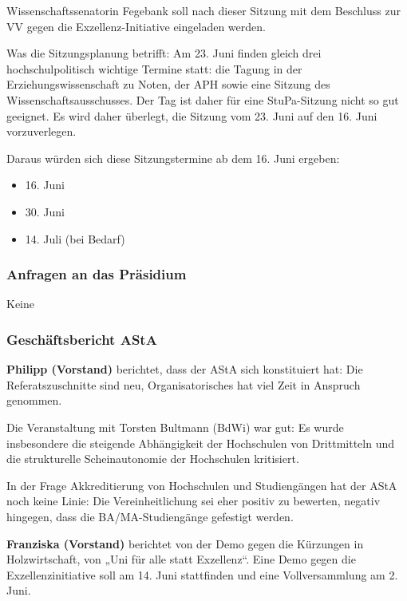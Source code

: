 \documentclass[ngerman,headheight=70pt]{scrartcl}
\begin{document}
    Wissenschaftssenatorin Fegebank soll nach dieser Sitzung mit dem Beschluss
    zur VV gegen die Exzellenz-Initiative eingeladen werden.

    Was die Sitzungsplanung betrifft: Am 23. Juni finden gleich drei
    hochschulpolitisch wichtige Termine statt: die Tagung in der
    Erziehungswissenschaft zu Noten,  der APH sowie eine Sitzung des
    Wissenschaftsausschusses. Der Tag ist daher für eine StuPa-Sitzung nicht so
    gut geeignet. Es wird daher überlegt, die Sitzung vom 23. Juni auf den 16.
    Juni vorzuverlegen.

    Daraus würden sich diese Sitzungstermine ab dem 16. Juni ergeben:
    \begin{itemize}
        \item 16. Juni
        \item 30. Juni
        \item 14. Juli (bei Bedarf)
    \end{itemize}

    \subsubsection{Anfragen an das Präsidium}

    Keine

    \subsubsection{Geschäftsbericht AStA}

    \textbf{Philipp (Vorstand)} berichtet, dass der AStA sich konstituiert hat:
    Die Referatszuschnitte sind neu, Organisatorisches hat viel Zeit in Anspruch
    genommen.

    Die Veranstaltung mit Torsten Bultmann (BdWi) war gut: Es wurde insbesondere
    die steigende Abhängigkeit der Hochschulen von Drittmitteln und die
    strukturelle Scheinautonomie der Hochschulen kritisiert.

    In der Frage Akkreditierung von Hochschulen und Studiengängen hat der AStA
    noch keine Linie: Die Vereinheitlichung sei eher positiv zu bewerten, negativ
    hingegen, dass die BA/MA-Studiengänge gefestigt werden.

    \textbf{Franziska (Vorstand)} berichtet von der Demo gegen die Kürzungen in
    Holzwirtschaft, von „Uni für alle statt Exzellenz“. Eine Demo gegen die
    Exzellenzinitiative soll am 14. Juni stattfinden und eine Vollversammlung
    am 2. Juni.
\end{document}
